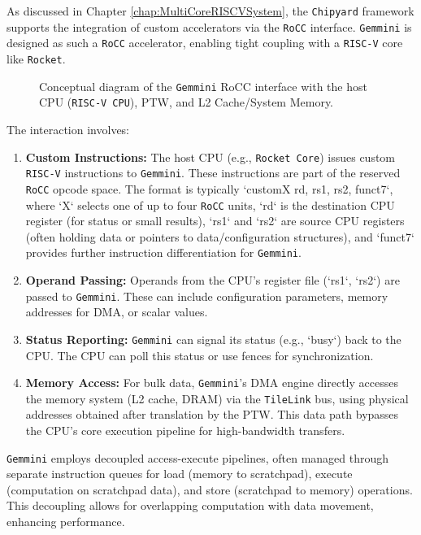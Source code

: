 As discussed in Chapter \ref{chap:MultiCoreRISCVSystem}, the \texttt{Chipyard} framework supports the integration of custom accelerators via the \texttt{RoCC} interface. \texttt{Gemmini} is designed as such a \texttt{RoCC} accelerator, enabling tight coupling with a \texttt{RISC-V} core like \texttt{Rocket}.

\begin{figure}[h!]
    \centering
    \caption{Conceptual diagram of the \texttt{Gemmini} RoCC interface with the host CPU (\texttt{RISC-V CPU}), PTW, and L2 Cache/System Memory.}
    \label{fig:gemmini_rocc_interface}
\end{figure}

The interaction involves:
\begin{enumerate}
    \item \textbf{Custom Instructions:} The host CPU (e.g., \texttt{Rocket Core}) issues custom \texttt{RISC-V} instructions to \texttt{Gemmini}. These instructions are part of the reserved \texttt{RoCC} opcode space. The format is typically `customX rd, rs1, rs2, funct7`, where `X` selects one of up to four \texttt{RoCC} units, `rd` is the destination CPU register (for status or small results), `rs1` and `rs2` are source CPU registers (often holding data or pointers to data/configuration structures), and `funct7` provides further instruction differentiation for \texttt{Gemmini}.
    \item \textbf{Operand Passing:} Operands from the CPU's register file (`rs1`, `rs2`) are passed to \texttt{Gemmini}. These can include configuration parameters, memory addresses for DMA, or scalar values.
    \item \textbf{Status Reporting:} \texttt{Gemmini} can signal its status (e.g., `busy`) back to the CPU. The CPU can poll this status or use fences for synchronization.
    \item \textbf{Memory Access:} For bulk data, \texttt{Gemmini}'s DMA engine directly accesses the memory system (L2 cache, DRAM) via the \texttt{TileLink} bus, using physical addresses obtained after translation by the PTW. This data path bypasses the CPU's core execution pipeline for high-bandwidth transfers.
\end{enumerate}

\texttt{Gemmini} employs decoupled access-execute pipelines, often managed through separate instruction queues for load (memory to scratchpad), execute (computation on scratchpad data), and store (scratchpad to memory) operations. This decoupling allows for overlapping computation with data movement, enhancing performance.


